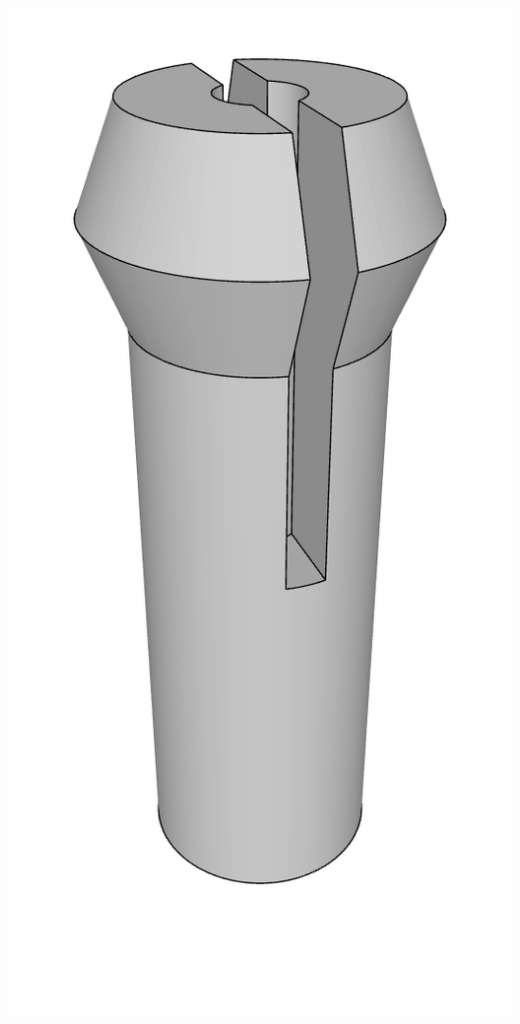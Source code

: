 \begin{center}
  \hfill
  \begin{minipage}[b]{0.32\textwidth}
    \includegraphics[width=\textwidth]{../images/3DPrinting/Pin2.png}
  \end{minipage}
  \hfill
  \begin{minipage}[b]{0.32\textwidth}

\end{minipage}
\end{center}
